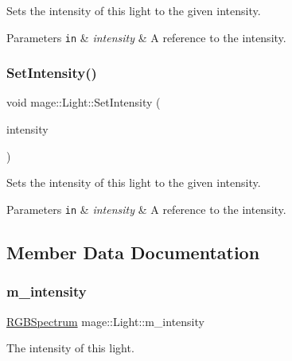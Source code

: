 Sets the intensity of this light to the given intensity.


\begin{DoxyParams}[1]{Parameters}
\mbox{\tt in}  & {\em intensity} & A reference to the intensity. \\
\hline
\end{DoxyParams}
\hypertarget{classmage_1_1_light_af96cc7c32afbfdc4d9b1a19b8ac0bf13}{}\label{classmage_1_1_light_af96cc7c32afbfdc4d9b1a19b8ac0bf13} 
\subsubsection{\texorpdfstring{Set\+Intensity()}{SetIntensity()}\hspace{0.1cm}{\footnotesize\ttfamily [2/2]}}
{\footnotesize\ttfamily void mage\+::\+Light\+::\+Set\+Intensity (\begin{DoxyParamCaption}\item[{\hyperlink{structmage_1_1_r_g_b_spectrum}{R\+G\+B\+Spectrum} \&\&}]{intensity }\end{DoxyParamCaption})\hspace{0.3cm}{\ttfamily [noexcept]}}

Sets the intensity of this light to the given intensity.


\begin{DoxyParams}[1]{Parameters}
\mbox{\tt in}  & {\em intensity} & A reference to the intensity. \\
\hline
\end{DoxyParams}


\subsection{Member Data Documentation}
\hypertarget{classmage_1_1_light_a4ed8d43c8a4df71671a922d5f04974b8}{}\label{classmage_1_1_light_a4ed8d43c8a4df71671a922d5f04974b8} 
\subsubsection{\texorpdfstring{m\+\_\+intensity}{m\_intensity}}
{\footnotesize\ttfamily \hyperlink{structmage_1_1_r_g_b_spectrum}{R\+G\+B\+Spectrum} mage\+::\+Light\+::m\+\_\+intensity\hspace{0.3cm}{\ttfamily [private]}}

The intensity of this light. 